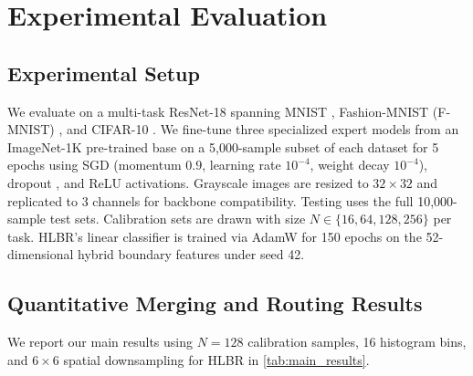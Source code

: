 \documentclass{article}
\theoremstyle{plain}
\theoremstyle{definition}
\theoremstyle{remark}
\begin{document}
\section{Experimental Evaluation}
\label{sec:eval}

\subsection{Experimental Setup}
We evaluate on a multi-task ResNet-18 \citep{He_2016} spanning MNIST \citep{LeCun_1998}, Fashion-MNIST (F-MNIST) \citep{Xiao_2017}, and CIFAR-10 \citep{Krizhevsky_2009}. We fine-tune three specialized expert models from an ImageNet-1K pre-trained base on a 5,000-sample subset of each dataset for 5 epochs using SGD (momentum $0.9$, learning rate $10^{-4}$, weight decay $10^{-4}$), dropout \citep{Srivastava_2014}, and ReLU activations. Grayscale images are resized to $32 \times 32$ and replicated to 3 channels for backbone compatibility. Testing uses the full 10,000-sample test sets. Calibration sets are drawn with size $N \in \{16, 64, 128, 256\}$ per task. HLBR's linear classifier is trained via AdamW \citep{Loshchilov_2017} for 150 epochs on the 52-dimensional hybrid boundary features under seed 42.

\subsection{Quantitative Merging and Routing Results}
We report our main results using $N=128$ calibration samples, 16 histogram bins, and $6\times6$ spatial downsampling for HLBR in \cref{tab:main_results}.
\end{document}
